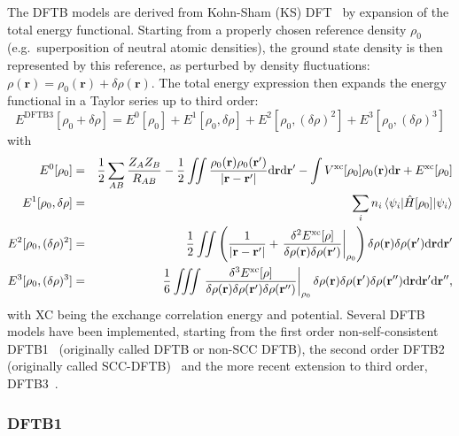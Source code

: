 \documentclass[reprint,onecolumn,superscriptaddress]{revtex4-1}
\begin{document}
The DFTB models are derived from Kohn-Sham (KS) DFT~\cite{Kohn1965}
by expansion of the total energy functional.  Starting from a properly
chosen reference density $\rho_0$ (e.g.\ superposition of neutral atomic
densities), the ground state density is then represented by this reference, as 
perturbed by density fluctuations:
$\rho(\mathbf{r}) = \rho_0(\mathbf{r}) +\delta\rho(\mathbf{r})$.  The total
energy expression then expands the energy functional in a Taylor series up to third
order:
\begin{equation}
  E^{\text{DFTB3}}[\rho_0+\delta\rho] = E^0[\rho_0] + E^1[\rho_0,\delta \rho] +
  E^2[\rho_0,(\delta \rho)^2] + E^3[\rho_0,(\delta \rho)^3]
\end{equation}
with
\begin{eqnarray}
  E^0[\rho_0] &=& \frac 12 \sum_{AB} \frac{Z_AZ_B}{R_{AB}} -\frac 12 \iint
  \frac{\rho_0(\mathbf{r})\rho_0(\mathbf{r}')}{|\mathbf{r}-\mathbf{r}'|}
  \mathrm{d}\mathbf{r} \mathrm{d}\mathbf{r}' -\int
  V^{\text{xc}}[\rho_0]\rho_0(\mathbf{r})\text{d}\mathbf{r} +
  E^{\text{xc}}[\rho_0] \nonumber\\ E^1[\rho_0,\delta \rho] &=& \sum_i n_i
  \mel{\psi_i}{\hat{H}[\rho_0]}{\psi_i} \nonumber\\ E^2[\rho_0,(\delta \rho)^2]
  &=& \frac{1}{2} \iint \left( \frac{1}{|\mathbf{r}-\mathbf{r}'|} + \eval{
    \frac{\delta^2E^{\text{xc}}[\rho]}{\delta\rho(\mathbf{r})
      \delta\rho(\mathbf{r}')} }_{\rho_0} \right) \delta\rho(\mathbf{r})
  \delta\rho(\mathbf{r}') \mathrm{d}\mathbf{r} \mathrm{d}\mathbf{r}' \nonumber
  \\ E^3[\rho_0,(\delta \rho)^3] &=& \frac{1}{6} \iiint \eval{
    \frac{\delta^3E^{\text{xc}}[\rho]}{\delta\rho(\mathbf{r})
      \delta\rho(\mathbf{r}') \delta\rho(\mathbf{r}'')} }_{\rho_0}
  \delta\rho(\mathbf{r}) \delta\rho(\mathbf{r}') \delta\rho(\mathbf{r}'')
  \mathrm{d}\mathbf{r} \mathrm{d}\mathbf{r}'
  \mathrm{d}\mathbf{r}'',\label{DFTtaylor}
\end{eqnarray}
with XC being the exchange correlation energy and potential.
%
Several DFTB models have been implemented, starting from the first order
non-self-consistent DFTB1~\cite{Seifert1996,Porezag1995} (originally called
DFTB or non-SCC DFTB), the second order DFTB2 (originally called SCC-DFTB)~\cite{Elstner1998}
and the more recent extension to third order,
DFTB3~\cite{Elstner2007,Yang2007,Gaus2011,Gaus2012}.

\subsubsection{DFTB1}
\end{document}

